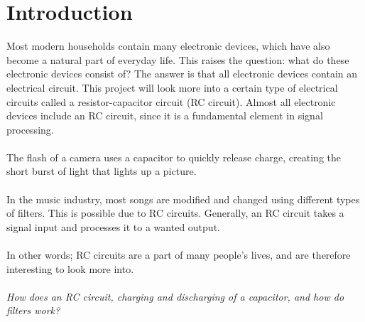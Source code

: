 \chapter{Introduction}
Most modern households contain many electronic devices, which have also become a natural part of everyday life. This raises the question: what do these electronic devices consist of? The answer is that all electronic devices contain an electrical circuit. This project will look more into a certain type of electrical circuits called a resistor-capacitor circuit (RC circuit). Almost all electronic devices include an RC circuit, since it is a fundamental element in signal processing. 
\\ \\
The flash of a camera uses a capacitor to quickly release charge, creating the short burst of light that lights up a picture.
\\ \\
In the music industry, most songs are modified and changed using different types of filters. This is possible due to RC circuits. Generally, an RC circuit takes a signal input and processes it to a wanted output. 
\\ \\
In other words; RC circuits are a part of many people’s lives, and are therefore interesting to look more into. 
\\ \\
\textit{How does an RC circuit, charging and discharging of a capacitor, and how do filters work?}
